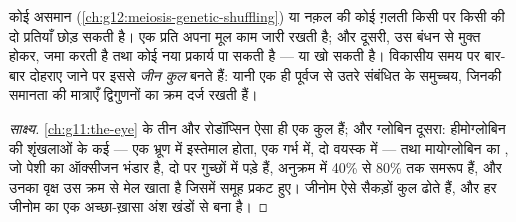 \begin{proposition}[जीन द्विगुणन और अपसरण]\label{prop:g12:diversification-of-life:duplication}
कोई असमान  (\cref{ch:g12:meiosis-genetic-shuffling}) या नक़ल की
कोई ग़लती किसी  पर किसी  की दो प्रतियाँ छोड़ सकती है। एक प्रति
अपना मूल काम जारी रखती है; और दूसरी, उस बंधन से मुक्त होकर, 
जमा करती है तथा कोई नया प्रकार्य पा सकती है --- या खो सकती है। विकासीय समय
पर बार-बार दोहराए जाने पर इससे \emph{जीन कुल} बनते हैं: यानी
एक ही पूर्वज से उतरे संबंधित  के समुच्चय, जिनकी समानता की मात्राएँ
द्विगुणनों का क्रम दर्ज रखती हैं।
\end{proposition}
\begin{proof}[साक्ष्य]
\cref{ch:g11:the-eye} के तीन  और रोडॉप्सिन ऐसा ही एक कुल हैं; और
ग्लोबिन दूसरा: हीमोग्लोबिन की शृंखलाओं के कई  --- एक भ्रूण में इस्तेमाल
होता, एक गर्भ में, दो वयस्क में --- तथा मायोग्लोबिन का , जो पेशी का
ऑक्सीजन भंडार है, दो  पर गुच्छों में पड़े हैं, अनुक्रम में 40\% से
80\% तक समरूप हैं, और उनका वृक्ष उस क्रम से मेल खाता है जिसमें  समूह
प्रकट हुए। जीनोम ऐसे सैकड़ों कुल ढोते हैं, और हर जीनोम का एक अच्छा-ख़ासा अंश
 खंडों से बना है।
\end{proof}

